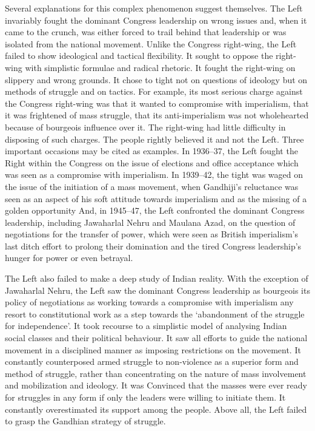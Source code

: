 \begin{multicols}{2}
Several explanations for this complex phenomenon suggest themselves. The Left invariably fought the dominant Congress leadership on wrong issues and, when it came to the crunch, was either forced to trail behind that leadership or was isolated from the national movement. Unlike the Congress right-wing, the Left failed to show ideological and tactical flexibility. It sought to oppose the right-wing with simplistic formulae and radical rhetoric. It fought the right-wing on slippery and wrong grounds. It chose to tight not on questions of ideology but on methods of struggle and on tactics. For example, its most serious charge against the Congress right-wing was that it wanted to compromise with imperialism, that it was frightened of mass struggle, that its anti-imperialism was not wholehearted because of bourgeois influence over it. The right-wing had little difficulty in disposing of such charges. The people rightly believed it and not the Left. Three important occasions may be cited as examples. In 1936--37, the Left fought the Right within the Congress on the issue of elections and office acceptance which was seen as a compromise with imperialism. In 1939--42, the tight was waged on the issue of the initiation of a mass movement, when Gandhiji's reluctance was seen as an aspect of his soft attitude towards imperialism and as the missing of a golden opportunity And, in 1945--47, the Left confronted the dominant Congress leadership, including Jawaharlal Nehru and Maulana Azad, on the question of negotiations for the transfer of power, which were seen as British imperialism's last ditch effort to prolong their domination and the tired Congress leadership's hunger for power or even betrayal. 

The Left also failed to make a deep study of Indian reality. With the exception of Jawaharlal Nehru, the Left saw the dominant Congress leadership as bourgeois its policy of negotiations as working towards a compromise with imperialism any resort to constitutional work as a step towards the `abandonment of the struggle for independence'. It took recourse to a simplistic model of analysing Indian social classes and their political behaviour. It saw all efforts to guide the national movement in a disciplined manner as imposing restrictions on the movement. It constantly counterposed armed struggle to non-violence as a superior form and method of struggle, rather than concentrating on the nature of mass involvement and mobilization and ideology. It was Convinced that the masses were ever ready for struggles in any form if only the leaders were willing to initiate them. It constantly overestimated its support among the people. Above all, the Left failed to grasp the Gandhian strategy of struggle. 


\end{multicols}
